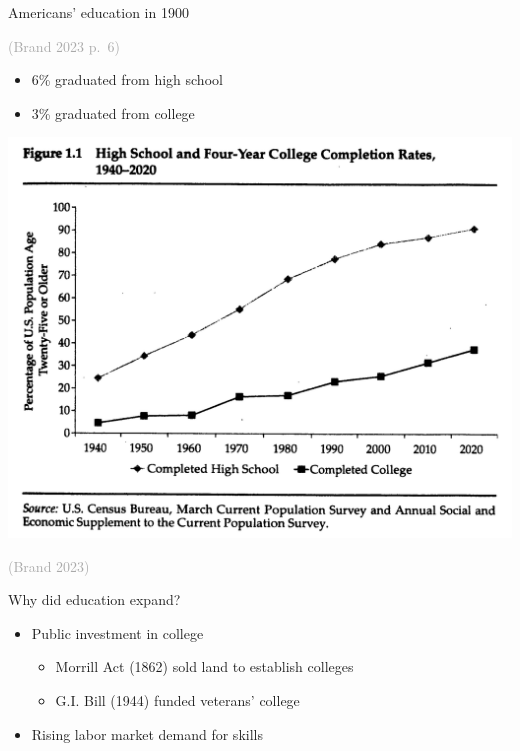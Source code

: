 \documentclass{beamer}
\newcommand\mycite[1]{\begin{scriptsize}\textcolor{darkgray}{(#1)}\end{scriptsize}}
\begin{document}
\begin{frame}

Americans' education in 1900\hfill \mycite{Brand 2023 p.~6}
\begin{itemize}
\item 6\% graduated from high school
\item 3\% graduated from college
\end{itemize}

\end{frame}

\begin{frame}

\includegraphics[width = .9\textwidth]{figures/brand_fig1}\\\hfill\mycite{Brand 2023}

\end{frame}

\begin{frame}{Why did education expand?} \pause
\begin{itemize}
\item Public investment in college
\begin{itemize}
\item Morrill Act (1862) sold land to establish colleges
\item G.I. Bill (1944) funded veterans' college
\end{itemize} \pause
\item Rising labor market demand for skills
\end{itemize}
\end{frame}
\end{document}
